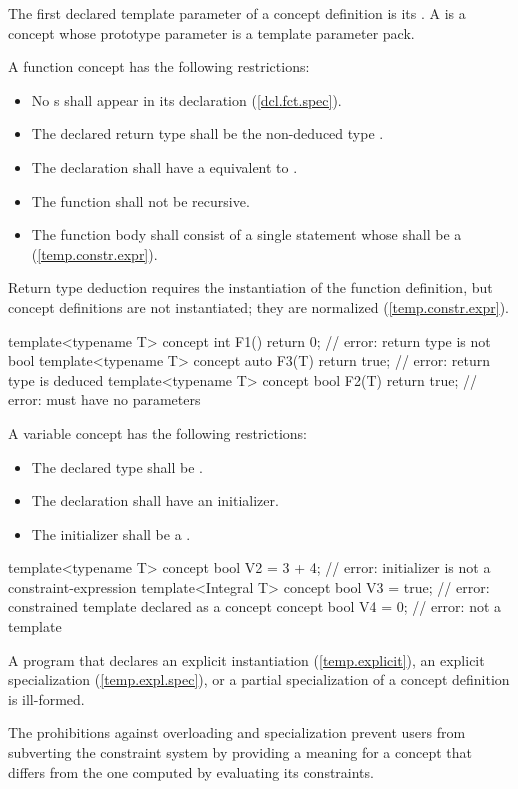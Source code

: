 \pnum
The first declared template parameter of a concept definition is its
. 
% 
A  is a concept whose prototype parameter
is a template parameter pack.


\pnum
A function concept has the following restrictions:
\begin{itemize}
  \item No s shall
       appear in its declaration (\ref{dcl.fct.spec}). 
  \item The declared return type shall be the non-deduced type . 
  \item The declaration shall have a 
  equivalent to \tcode{()}. 
  \item The function shall not be recursive. 
  \item The function body shall consist of a single  
  statement whose  shall be a
  (\ref{temp.constr.expr}).
\end{itemize}
% 
\enternote
Return type deduction requires the instantiation of the function 
definition, but concept definitions are not instantiated; they
are normalized (\ref{temp.constr.expr}).
\exitnote
% 
\enterexample
\begin{codeblock}
template<typename T> 
  concept int F1() { return 0; }      // error: return type is not bool
template<typename T> 
  concept auto F3(T) { return true; } // error: return type is deduced
template<typename T> 
  concept bool F2(T) { return true; } // error: must have no parameters
\end{codeblock}
\exitexample

\pnum
A variable concept has the following restrictions:
\begin{itemize}
  \item The declared type shall be . 
  \item The declaration shall have an initializer. 
  \item The initializer shall be a 
  . 
\end{itemize}
\enterexample
\begin{codeblock}
template<typename T> 
  concept bool V2 = 3 + 4; // error: initializer is not a constraint-expression
template<Integral T> 
  concept bool V3 = true;  // error: constrained template declared as a concept
concept bool V4 = 0;       // error: not a template
\end{codeblock}
\exitexample

\pnum
A program that declares an explicit instantiation
(\ref{temp.explicit}), an explicit specialization 
(\ref{temp.expl.spec}), or a partial specialization 
of a concept definition is ill-formed.

\enternote
The prohibitions against overloading and specialization prevent
users from subverting the constraint system by providing a meaning 
for a concept that differs from the one computed by evaluating its 
constraints.
\exitnote

